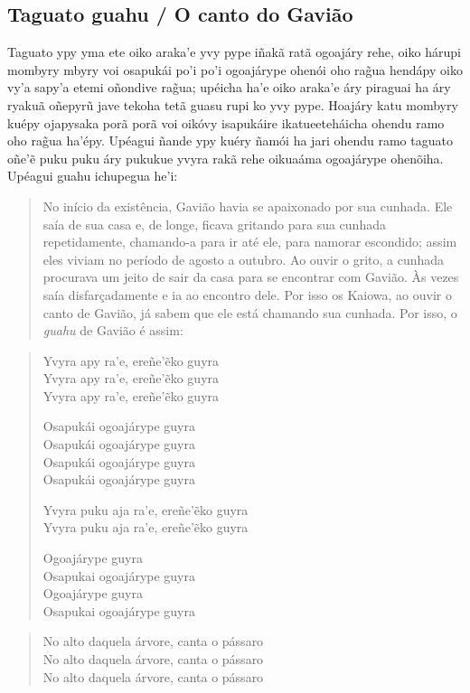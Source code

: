 \begin{itemize}
\chapter{Taguato guahu / O canto do Gavião}

Taguato ypy yma ete oiko araka'e yvy pype iñakã ratã ogoajáry rehe, oiko
hárupi mombyry mbyry voi osapukái po'i po'i ogoajárype ohenói oho rag̃ua
hendápy oiko vy'a sapy'a etemi oñondive rag̃ua; upéicha ha'e oiko araka'e
áry piraguai ha áry ryakuã oñepyrũ jave tekoha tetã guasu rupi ko yvy
pype. Hoajáry katu mombyry kuépy ojapysaka porã porã voi oikóvy
isapukáire ikatueeteháicha ohendu ramo oho rag̃ua ha'épy. Upéagui ñande
ypy kuéry ñamói ha jari ohendu ramo taguato oñe'ẽ puku puku áry pukukue
yvyra rakã rehe oikuaáma ogoajárype ohenõiha. Upéagui guahu ichupegua
he'i:

\begin{quote}
No início da existência, Gavião havia se apaixonado por sua cunhada. Ele
saía de sua casa e, de longe, ficava gritando para sua cunhada
repetidamente, chamando-a para ir até ele, para namorar escondido; assim
eles viviam no período de agosto a outubro. Ao ouvir o grito, a cunhada
procurava um jeito de sair da casa para se encontrar com Gavião. Às
vezes saía disfarçadamente e ia ao encontro dele. Por isso os Kaiowa, ao
ouvir o canto de Gavião, já sabem que ele está chamando sua cunhada. Por
isso, o \emph{guahu} de Gavião é assim:
\end{quote}

\begin{verse}
Yvyra apy ra'e, ereñe'ẽko guyra\\
Yvyra apy ra'e, ereñe'ẽko guyra\\
Yvyra apy ra'e, ereñe'ẽko guyra

Osapukái ogoajárype guyra\\
Osapukái ogoajárype guyra\\
Osapukái ogoajárype guyra\\
Osapukái ogoajárype guyra

Yvyra puku aja ra'e, ereñe'ẽko guyra\\
Yvyra puku aja ra'e, ereñe'ẽko guyra

Ogoajárype guyra\\
Osapukai ogoajárype guyra\\
Ogoajárype guyra\\
Osapukai ogoajárype guyra
\end{verse}

\begin{verse}
No alto daquela árvore, canta o pássaro\\
No alto daquela árvore, canta o pássaro\\
No alto daquela árvore, canta o pássaro


\end{verse}
\end{itemize}
